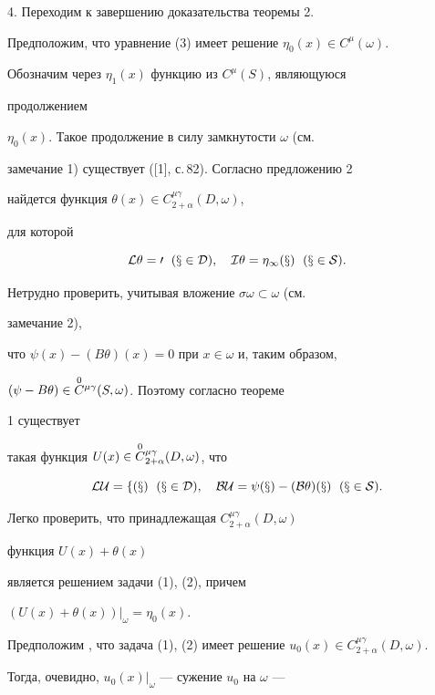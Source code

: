  


4. Переходим к завершению доказательства теоремы 2. 


 


Предположим, что уравнение (3) имеет решение $\eta_0(x)\in 


C^\mu(\omega)$. 


Обозначим через $\eta_1(x)$ функцию из $C^\mu(S)$, являющуюся 


продолжением 


$\eta_0(x)$. Такое продолжение в силу замкнутости $\omega$ (см. 


замечание 1) существует ([1], с.\,82). Согласно предложению 2 


найдется функция $\theta(x)\in C^{\mu\gamma}_{2+\alpha}(D,\omega)$,


для которой 


$$ 


\cal L\theta=0\ \;(x\in D),\quad I\theta=\eta_1(x)\ \; (x\in S). 


$$ 


Нетрудно проверить, учитывая вложение $\sigma\omega\subset\omega$ (см. 


замечание 2), 


что $\psi(x)-(B\theta)(x)=0$ при $x\in\omega$ и, таким образом, 


$(\psi-B\theta)\in\overset{0}{C}{}^{\mu\gamma}(S,\omega)$. Поэтому согласно теореме 


1 существует 


такая функция $U(x)\in\overset{0}{C}{}^{\mu\gamma}_{2+\alpha}(D,\omega)$, что 


$$ 


\cal L U=f(x)\ \; (x\in D),\quad B U=\psi(x)- 


(B\theta)(x)\ \; (x\in S). 


$$ 


Легко проверить, что принадлежащая $C^{\mu\gamma}_{2+\alpha}(D,\omega)$ 


функция $U(x)+\theta(x)$ 


является решением задачи (1), (2), причем 


$(U(x)+\theta(x))\big|_\omega=\eta_0(x)$. 


 


Предположим , что задача (1), (2) имеет решение $u_0(x)\in 


C^{\mu\gamma}_{2+\alpha}(D,\omega)$. 


Тогда, очевидно, $u_0(x)|_\omega$ --- сужение $u_0$ на $\omega$ --- 


